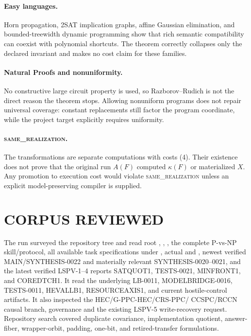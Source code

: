 \documentclass[11pt]{article}
\newcommand{\same}{\textsc{same\_realization}}
\begin{document}
\paragraph{Easy languages.}
Horn propagation, 2SAT implication graphs, affine Gaussian elimination, and
bounded-treewidth dynamic programming show that rich semantic compatibility
can coexist with polynomial shortcuts.  The theorem correctly collapses only
the declared invariant and makes no cost claim for these families.

\paragraph{Natural Proofs and nonuniformity.}
No constructive large circuit property is used, so Razborov--Rudich is not
the direct reason the theorem stops.  Allowing nonuniform programs does not
repair universal coverage: constant replacements still factor the program
coordinate, while the project target explicitly requires uniformity.

\paragraph{\same.}
The transformations are separate computations with costs (4).  Their
existence does not prove that the original run $A(F)$ computed $\kappa(F)$ or
materialized $X$.  Any promotion to execution cost would violate
\same{} unless an explicit model-preserving compiler is supplied.

\section{CORPUS REVIEWED}

The run surveyed the repository tree and read root ,
, , the complete P-vs-NP skill/protocol, all
available task specifications under , actual 
and , newest verified MAIN/SYNTHESIS-0022 and materially
relevant SYNTHESIS-0020--0021, and the latest verified LSPV-1--4 reports
SATQUOT1, TESTS-0021, MINFRONT1, and COREDTCH1.  It read the underlying
LB-0011, MODELBRIDGE-0016, TESTS-0011, HEVALLB1, RESOURCEAXIS1, and current
hostile-control artifacts.  It also inspected the HEC/G-PPC-HEC/CRS-PPC/
CCSPC/RCCN causal branch, governance and the existing LSPV-5 write-recovery
request.  Repository search covered duplicate covariance, implementation
quotient, answer-fiber, wrapper-orbit, padding, one-bit, and retired-transfer
formulations.
\end{document}
